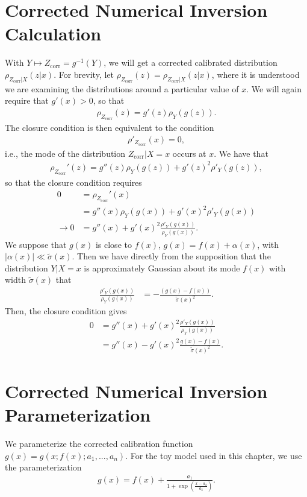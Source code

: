 \section{Corrected Numerical Inversion Calculation}
\label{sec:NI:corrected_numerical_inversion_calculation}
With $Y\mapsto Z_\text{corr} = g^{-1}(Y)$, we will get a corrected calibrated distribution $\rho_{Z_\text{corr}|X}(z|x)$. For brevity, let $\rho_{Z_\text{corr}}(z)=\rho_{Z_\text{corr}|X}(z|x)$, where it is understood we are examining the distributions around a particular value of $x$. We will again require that $g'(x)>0$, so that
\begin{align}
\rho_{Z_\text{corr}}(z) = g'(z)\rho_Y(g(z)).
\end{align}
The closure condition is then equivalent to the condition
\begin{align}
\rho'_{Z_\text{corr}}(x) = 0,
\end{align}
i.e., the mode of the distribution $Z_\text{corr}|X=x$ occurs at $x$.  We have that
\begin{align}
\rho_{Z_\text{corr}}'(z) = g''(z)\rho_Y(g(z))+g'(z)^2\rho'_Y(g(z)),
\end{align}
so that the closure condition requires
\begin{align}
0 &=\rho_{Z_\text{corr}}'(x)\nonumber\\
&=g''(x)\rho_Y(g(x))+g'(x)^2\rho'_Y(g(x))\nonumber\\
\rightarrow 0 &=g''(x)+g'(x)^2\frac{\rho'_Y(g(x))}{\rho_Y(g(x))}.
\end{align}
We suppose that $g(x)$ is close to $f(x)$, $g(x)=f(x)+\alpha(x)$, with $|\alpha(x)|\ll \tilde{\sigma}(x)$. Then we have directly from the supposition that the distribution $Y|X=x$ is approximately Gaussian about its mode $f(x)$ with width $\tilde{\sigma}(x)$ that
\begin{align}
\frac{\rho'_Y(g(x))}{\rho_Y(g(x))} &= -\frac{\left(g(x)-f(x)\right)}{\tilde{\sigma}(x)^2}.
\end{align}
Then, the closure condition gives
\begin{align}
0 &=g''(x)+g'(x)^2\frac{\rho'_Y(g(x))}{\rho_Y(g(x))}\nonumber\\
&=g''(x)-g'(x)^2\frac{g(x)-f(x)}{\tilde{\sigma}(x)^2}.
\end{align}

\section{Corrected Numerical Inversion Parameterization}
\label{sec:NI:corrected_numerical_inversion_parameterization}
We parameterize the corrected calibration function $g(x) = g(x;f(x);a_1,...,a_n)$. For the toy model used in this chapter, we use the parameterization
\begin{align}
g(x) = f(x)+\frac{a_1}{1+\exp(\frac{x-a_2}{a_3})}.
\label{eqn:NI:app_parameterization}
\end{align}

